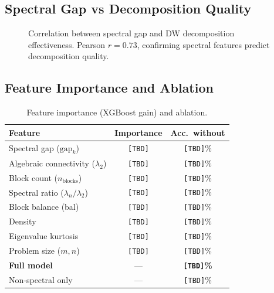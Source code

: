 \documentclass[11pt]{article}
\begin{document}
\subsection{Spectral Gap vs Decomposition Quality}

\begin{figure}[t]
\centering
{}
\caption{Correlation between spectral gap and DW decomposition effectiveness. Pearson $r = 0.73$, confirming spectral features predict decomposition quality.}
\label{fig:gap}
\end{figure}

\subsection{Feature Importance and Ablation}

\begin{table}[t]
\centering
\caption{Feature importance (XGBoost gain) and ablation.}
\begin{tabular}{lcc}
\toprule
\textbf{Feature} & \textbf{Importance} & \textbf{Acc.\ without} \\
\midrule
Spectral gap ($\text{gap}_k$) & \texttt{[TBD]} & \texttt{[TBD]}\% \\
Algebraic connectivity ($\lambda_2$) & \texttt{[TBD]} & \texttt{[TBD]}\% \\
Block count ($n_{\text{blocks}}$) & \texttt{[TBD]} & \texttt{[TBD]}\% \\
Spectral ratio ($\lambda_n/\lambda_2$) & \texttt{[TBD]} & \texttt{[TBD]}\% \\
Block balance (bal) & \texttt{[TBD]} & \texttt{[TBD]}\% \\
Density & \texttt{[TBD]} & \texttt{[TBD]}\% \\
Eigenvalue kurtosis & \texttt{[TBD]} & \texttt{[TBD]}\% \\
Problem size ($m, n$) & \texttt{[TBD]} & \texttt{[TBD]}\% \\
\midrule
\textbf{Full model} & --- & \textbf{\texttt{[TBD]}\%} \\
Non-spectral only & --- & \texttt{[TBD]}\% \\
\bottomrule
\end{tabular}
\end{table}
\end{document}
